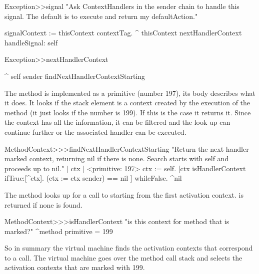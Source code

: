 \documentclass[a4paper,10pt,twoside]{book}
\begin{document}
\begin{code}{}
Exception>>signal
	"Ask ContextHandlers in the sender chain to handle this signal.  The default is to execute and return my defaultAction."

	signalContext := thisContext contextTag.
	^ thisContext nextHandlerContext handleSignal: self
\end{code}

\begin{code}{}
Exception>>nextHandlerContext

	^ self sender findNextHandlerContextStarting
\end{code}

The method  is implemented as a primitive (number 197), its body describes what it does. It looks 
if the stack element is a context created by the execution of the method  (it just looks if the number is 199). If this is  the case it returns it. Since the context has all the information, it can be filtered and the look up can continue further or the associated handler can be executed. 

\begin{code}{}
MethodContext>>>findNextHandlerContextStarting 
	"Return the next handler marked context, returning nil if there 
	is none. Search starts with self and proceeds up to nil." 
	| ctx |	
	<primitive: 197> 
	ctx := self. 
	[ctx isHandlerContext ifTrue:[^ctx]. 
	(ctx := ctx sender) == nil ] whileFalse. 
	^nil 
\end{code}

The method  looks up for a call to  starting from the first activation context.  is returned if none is found. 

\begin{code}{}
MethodContext>>>isHandlerContext 
	"is this context for method that is marked?" 
	^method primitive = 199 
\end{code}

So in summary the virtual machine finds the activation contexts that correspond to a  call. The virtual machine goes over the method call stack and selects the activation contexts that are marked with 199.



\end{document}
